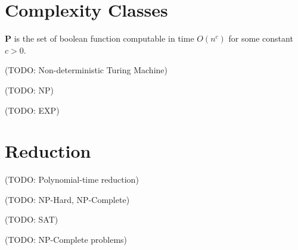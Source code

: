     \section {Complexity Classes}
        \begin{defn}[P] \label{def_comp_p}
        $\mathbf{P}$ is the set of boolean function computable in time $O(n^c)$ for some constant $c>0$.
        \end{defn}
        
        (TODO: Non-deterministic Turing Machine)
        
        (TODO: NP)
        
        (TODO: EXP)
    
    \section {Reduction}
        (TODO: Polynomial-time reduction)
        
        (TODO: NP-Hard, NP-Complete)
        
        (TODO: SAT)
        
        (TODO: NP-Complete problems)
        
